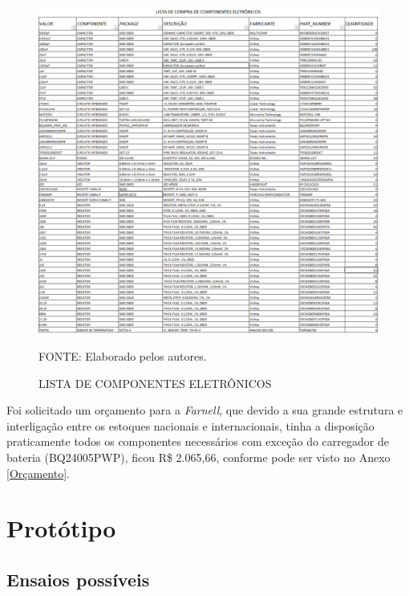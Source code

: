 \documentclass[
	12pt,				%
	openright,			%
	oneside,			%
	a4paper,			%
	english,			%
	french,				%
	spanish,			%
	brazil,				%
	oldfontcommands
	]{abntex2}
\begin{document}
	\begin{figure}[th]
		\caption{LISTA DE COMPONENTES ELETRÔNICOS}
		\label{Fig_Lista}
		\centering
		\includegraphics[width=1.0\linewidth]{./figs/comp}
			
		\begin{small}
			FONTE: Elaborado pelos autores.
		\end{small}		
	\end{figure}
	\pagebreak
	
	Foi solicitado um orçamento para a \textit{Farnell}, que devido a sua grande estrutura e interligação entre os estoques nacionais e internacionais, tinha a disposição praticamente todos os componentes necessários com exceção do carregador de bateria (BQ24005PWP), ficou R\$ 2.065,66, conforme pode ser visto no Anexo \ref{Orçamento}.
	


	
	
\chapter[Protótipo]{Protótipo}

\section[Ensaios possíveis]{Ensaios possíveis}
	
\end{document}
